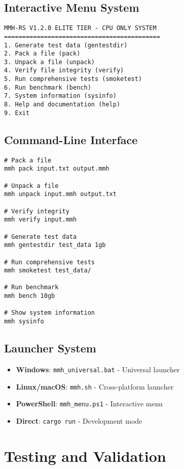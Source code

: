 \documentclass[12pt,a4paper]{article}
\begin{document}
\subsection{Interactive Menu System}
\begin{lstlisting}[caption=Main Menu Options]
MMH-RS V1.2.0 ELITE TIER - CPU ONLY SYSTEM
===========================================
1. Generate test data (gentestdir)
2. Pack a file (pack)
3. Unpack a file (unpack)
4. Verify file integrity (verify)
5. Run comprehensive tests (smoketest)
6. Run benchmark (bench)
7. System information (sysinfo)
8. Help and documentation (help)
9. Exit
\end{lstlisting}

\subsection{Command-Line Interface}
\begin{lstlisting}[caption=Basic Commands]
# Pack a file
mmh pack input.txt output.mmh

# Unpack a file
mmh unpack input.mmh output.txt

# Verify integrity
mmh verify input.mmh

# Generate test data
mmh gentestdir test_data 1gb

# Run comprehensive tests
mmh smoketest test_data/

# Run benchmark
mmh bench 10gb

# Show system information
mmh sysinfo
\end{lstlisting}

\subsection{Launcher System}
\begin{itemize}
    \item \textbf{Windows}: \texttt{mmh\_universal.bat} - Universal launcher
    \item \textbf{Linux/macOS}: \texttt{mmh.sh} - Cross-platform launcher
    \item \textbf{PowerShell}: \texttt{mmh\_menu.ps1} - Interactive menu
    \item \textbf{Direct}: \texttt{cargo run} - Development mode
\end{itemize}

\newpage

\section{Testing and Validation}
\end{document}
